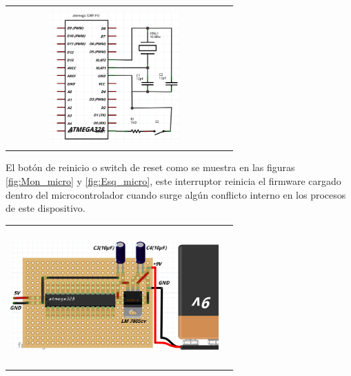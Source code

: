 \documentclass[12]{article}
\newenvironment{Figure}
{\par\medskip\noindent\minipage{\linewidth}}
{\endminipage\par\medskip}
\begin{document}
\begin{multicols}{2}
\begin{Figure}
\center
\begin{tabular}{|l|r|}
\hline
\\
\includegraphics[width=8cm, height=5cm]{img/G1.png}  \\\\ \hline
\end{tabular}
\label{fig:Esq_micro}
\end{Figure}
El botón de reinicio o switch de reset como se muestra en las figuras \ref{fig:Mon_micro} y \ref{fig:Esq_micro}, este interruptor reinicia el firmware cargado dentro del microcontrolador cuando surge algún conflicto interno en los procesos de este dispositivo. 
\begin{Figure}
\center
\begin{tabular}{|l|r|}
\hline
\\
\includegraphics[width=8cm, height=5cm]{img/F2.png}  \\\\ \hline
\end{tabular}

\end{Figure}
\end{multicols}
\end{document}

